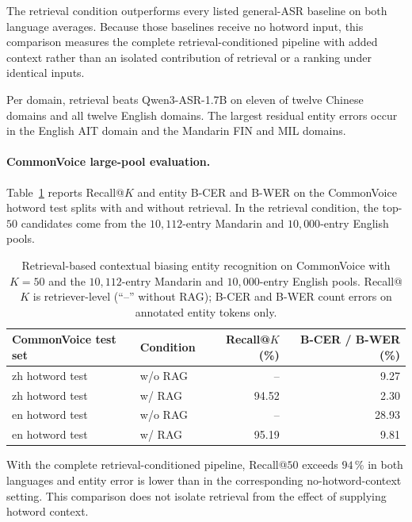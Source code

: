 The retrieval condition outperforms every listed general-ASR baseline
on both language averages.
Because those baselines receive no hotword input, this comparison
measures the complete retrieval-conditioned pipeline with added
context rather than an isolated contribution of retrieval or a ranking
under identical inputs.

Per domain, retrieval beats Qwen3-ASR-1.7B on eleven of twelve Chinese
domains and all twelve English domains.
The largest residual entity errors occur in the English AIT domain
and the Mandarin FIN and MIL domains.

\paragraph{CommonVoice large-pool evaluation.}
Table~\ref{tab:hotwords_retrieve} reports Recall@$K$ and entity B-CER
and B-WER on the CommonVoice hotword test splits with and without
retrieval. In the retrieval condition, the top-$50$ candidates come
from the $10{,}112$-entry Mandarin and $10{,}000$-entry English pools.

\begin{table}[t]
  \caption{Retrieval-based contextual biasing entity recognition on
    CommonVoice with $K{=}50$ and the $10{,}112$-entry Mandarin and
    $10{,}000$-entry English pools. Recall@$K$ is retriever-level
    (``--'' without RAG); B-CER and B-WER count
    errors on annotated entity tokens only.}
  \label{tab:hotwords_retrieve}
  \centering
  \small
  \setlength{\tabcolsep}{4pt}
  \begin{tabular}{llrr}
    \toprule
    CommonVoice test set & Condition & Recall@$K$ (\%) & B-CER / B-WER (\%) \\
    \midrule
    zh hotword test & w/o RAG & --     & 9.27  \\
    zh hotword test & w/ RAG  & 94.52  & 2.30  \\
    en hotword test & w/o RAG & --     & 28.93 \\
    en hotword test & w/ RAG  & 95.19  & 9.81  \\
    \bottomrule
  \end{tabular}
\end{table}

With the complete retrieval-conditioned pipeline, Recall@$50$ exceeds
$94$\,\% in both languages and entity error is lower than in the
corresponding no-hotword-context setting. This comparison does not
isolate retrieval from the effect of supplying hotword context.

